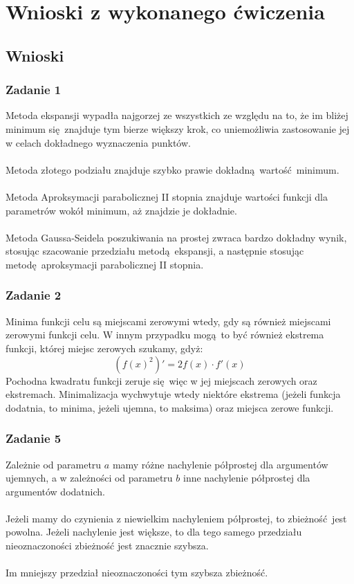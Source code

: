 \documentclass[a4paper, 12pt]{article}
\begin{document}
	\section{Wnioski z wykonanego ćwiczenia}
		\subsection{Wnioski}
			\subsubsection{Zadanie 1}
				Metoda ekspansji wypadła najgorzej ze wszystkich ze względu na to, że im bliżej minimum się znajduje tym bierze większy krok, co uniemożliwia zastosowanie jej w celach dokładnego wyznaczenia punktów.
				\\ \\
				Metoda złotego podziału znajduje szybko prawie dokładną wartość minimum.
				\\ \\
				Metoda Aproksymacji parabolicznej II stopnia znajduje wartości funkcji dla parametrów wokół minimum, aż znajdzie je dokładnie.
				\\
				\\
				Metoda Gaussa-Seidela poszukiwania na prostej zwraca bardzo dokładny wynik, stosując szacowanie przedziału metodą ekspansji, a następnie stosując metodę aproksymacji parabolicznej II stopnia.
			\subsubsection{Zadanie 2}
				Minima funkcji celu są miejscami zerowymi wtedy, gdy są również miejscami zerowymi funkcji celu. W innym przypadku mogą to być również ekstrema funkcji, której miejsc zerowych szukamy, gdyż:
				$$
					(f(x)^2)' = 2 f(x) \cdot f'(x)
				$$
				Pochodna kwadratu funkcji zeruje się więc w jej miejscach zerowych oraz ekstremach. Minimalizacja wychwytuje wtedy niektóre ekstrema (jeżeli funkcja dodatnia, to minima, jeżeli ujemna, to maksima) oraz miejsca zerowe funkcji.
			\subsubsection{Zadanie 5}
				Zależnie od parametru $a$ mamy różne nachylenie półprostej dla argumentów ujemnych, a w zależności od parametru $b$ inne nachylenie półprostej dla argumentów dodatnich. \\ \\
				Jeżeli mamy do czynienia z niewielkim nachyleniem półprostej, to zbieżność jest powolna. Jeżeli nachylenie jest większe, to dla tego samego przedziału nieoznaczoności zbieżność jest znacznie szybsza. \\ \\
				Im mniejszy przedział nieoznaczoności tym szybsza zbieżność.
\end{document}
